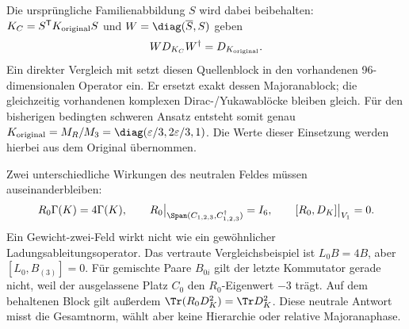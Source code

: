 Die ursprüngliche Familienabbildung $S$ wird dabei beibehalten:
$K_C=S^{\mathsf T}K_{\rm original}S$ und
$W=\diag(\overline S,S)$ geben
\begin{equation}
W D_{K_C}W^\dagger=D_{K_{\rm original}}.
\end{equation}
Ein direkter Vergleich mit 
setzt diesen Quellenblock in den vorhandenen 96-dimensionalen Operator
ein. Er ersetzt exakt dessen Majoranablock; die gleichzeitig vorhandenen
komplexen Dirac-/Yukawablöcke bleiben gleich. Für den bisherigen bedingten
schweren Ansatz entsteht somit genau
$K_{\rm original}=M_R/M_3=\diag(\varepsilon/3,2\varepsilon/3,1)$.
Die Werte dieser Einsetzung werden hierbei aus dem Original übernommen.

Zwei unterschiedliche Wirkungen des neutralen Feldes müssen auseinanderbleiben:
\begin{equation}
R_0\Gamma(K)=4\Gamma(K),\qquad
R_0\big|_{\Span(C_{1,2,3},C_{1,2,3}^\dagger)}=I_6,
\qquad [R_0,D_K]\big|_{V_1}=0.
\end{equation}
Ein Gewicht-zwei-Feld wirkt nicht wie ein gewöhnlicher
Ladungsableitungsoperator. Das vertraute Vergleichsbeispiel ist
$L_0B=4B$, aber $[L_0,B_{(3)}]=0$.
Für gemischte Paare $B_{0i}$ gilt der letzte Kommutator gerade nicht,
weil der ausgelassene Platz $C_0$ den $R_0$-Eigenwert $-3$ trägt.
Auf dem behaltenen Block gilt außerdem
$\Tr(R_0D_K^2)=\Tr D_K^2$.
Diese neutrale Antwort misst die Gesamtnorm, wählt aber keine
Hierarchie oder relative Majoranaphase.

